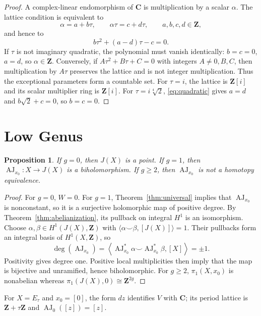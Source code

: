 \documentclass[11pt]{article}
\numberwithin{equation}{section}
\newtheorem{proposition}[theorem]{Proposition}
\theoremstyle{definition}
\newcommand{\Z}{\mathbf Z}
\newcommand{\C}{\mathbf C}
\newcommand{\AJ}{\operatorname{AJ}}
\begin{document}
\begin{proof}
A complex-linear endomorphism of $\C$ is multiplication by a scalar
$\alpha$. The lattice condition is equivalent to
\[
 \alpha=a+b\tau,\qquad \alpha\tau=c+d\tau,
 \qquad a,b,c,d\in\Z,
\]
and hence to
\begin{equation}\label{eq:quadratic}
 b\tau^2+(a-d)\tau-c=0.
\end{equation}
If $\tau$ is not imaginary quadratic, the polynomial must vanish
identically: $b=c=0$, $a=d$, so $\alpha\in\Z$. Conversely, if
$A\tau^2+B\tau+C=0$ with integers $A\neq0,B,C$, then multiplication
by $A\tau$ preserves the lattice and is not integer multiplication.
Thus the exceptional parameters form a countable set.
For $\tau=i$, the lattice is $\Z[i]$ and its scalar multiplier ring is
$\Z[i]$. For $\tau=i\sqrt[4]{2}$, \eqref{eq:quadratic} gives
$a=d$ and $b\sqrt2+c=0$, so $b=c=0$.
\end{proof}

\section{Low Genus}

\begin{proposition}
If $g=0$, then $J(X)$ is a point. If $g=1$, then
$\AJ_{x_0}:X\to J(X)$ is a biholomorphism. If $g\geq2$, then
$\AJ_{x_0}$ is not a homotopy equivalence.
\end{proposition}

\begin{proof}
For $g=0$, $W=0$. For $g=1$, Theorem~\ref{thm:universal} implies that
$\AJ_{x_0}$ is nonconstant, so it is a surjective holomorphic map of
positive degree. By Theorem~\ref{thm:abelianization}, its pullback on
integral $H^1$ is an isomorphism. Choose $\alpha,\beta\in H^1(J(X),\Z)$
with $\langle\alpha\smile\beta,[J(X)]\rangle=1$. Their pullbacks form
an integral basis of $H^1(X,\Z)$, so
\[
 \deg(\AJ_{x_0})
 =\left\langle\AJ_{x_0}^*\alpha\smile\AJ_{x_0}^*\beta,[X]\right\rangle
 =\pm1.
\]
Positivity gives degree one. Positive local multiplicities then imply
that the map is bijective and unramified, hence biholomorphic.
For $g\geq2$, $\pi_1(X,x_0)$ is nonabelian whereas
$\pi_1(J(X),0)\cong\Z^{2g}$.
\end{proof}

For $X=E_\tau$ and $x_0=[0]$, the form $dz$ identifies $V$ with $\C$;
its period lattice is $\Z+\tau\Z$ and $\AJ_0([z])=[z]$.
\end{document}
